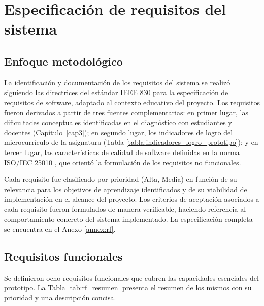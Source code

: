 \section{Especificación de requisitos del sistema}

\subsection{Enfoque metodológico}

La identificación y documentación de los requisitos del sistema se realizó siguiendo las directrices del estándar IEEE 830 \cite{ieee830} para la especificación de requisitos de software, adaptado al contexto educativo del proyecto. Los requisitos fueron derivados a partir de tres fuentes complementarias: en primer lugar, las dificultades conceptuales identificadas en el diagnóstico con estudiantes y docentes (Capítulo~\ref{cap3}); en segundo lugar, los indicadores de logro del microcurrículo de la asignatura (Tabla \ref{tabla:indicadores_logro_prototipo}); y en tercer lugar, las características de calidad de software definidas en la norma ISO/IEC 25010 \cite{iso25010}, que orientó la formulación de los requisitos no funcionales.

Cada requisito fue clasificado por prioridad (Alta, Media) en función de su relevancia para los objetivos de aprendizaje identificados y de su viabilidad de implementación en el alcance del proyecto. Los criterios de aceptación asociados a cada requisito fueron formulados de manera verificable, haciendo referencia al comportamiento concreto del sistema implementado. La especificación completa se encuentra en el Anexo \ref{annex:rf}.

\subsection{Requisitos funcionales}

Se definieron ocho requisitos funcionales que cubren las capacidades esenciales del prototipo. La Tabla \ref{tab:rf_resumen} presenta el resumen de los mismos con su prioridad y una descripción concisa.

